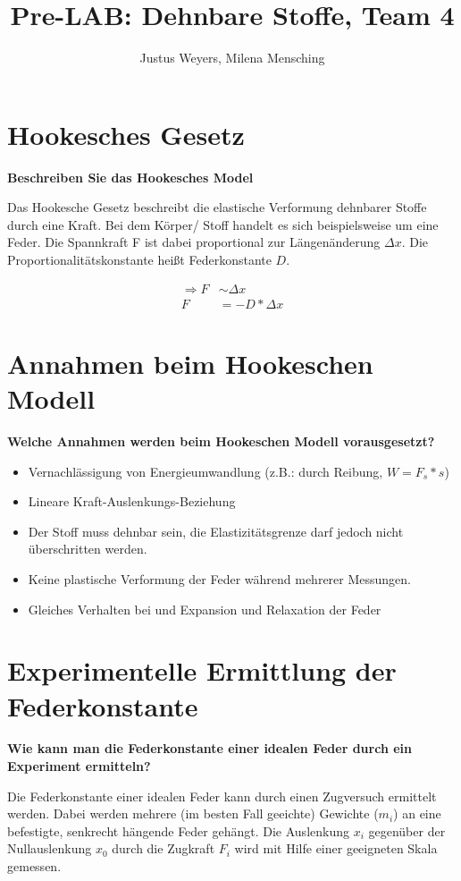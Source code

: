 \documentclass[a4paper, 12pt]{article}
\title{Pre-LAB: Dehnbare Stoffe, Team 4}
\author{Justus Weyers, Milena Mensching}
\begin{document}
\maketitle
\section{Hookesches Gesetz}
\textbf{Beschreiben Sie das Hookesches Model}

Das Hookesche Gesetz beschreibt die elastische Verformung dehnbarer Stoffe durch eine Kraft.
Bei dem Körper/ Stoff handelt es sich beispielsweise um eine Feder. 
Die Spannkraft F ist dabei proportional zur Längenänderung $\Delta x$. 
Die Proportionalitätskonstante heißt Federkonstante $D$.

\begin{equation}
	\begin{split}
		\Rightarrow F&\sim\Delta x\\
		F&= -D*\Delta x
	\end{split}
\end{equation}

\section{Annahmen beim Hookeschen Modell}
\textbf{Welche Annahmen werden beim Hookeschen Modell vorausgesetzt?}

\begin{itemize}
	\item{Vernachlässigung von Energieumwandlung (z.B.: durch Reibung, $W=F_s*s$)}
	\item{Lineare Kraft-Auslenkungs-Beziehung}
	\item{Der Stoff muss dehnbar sein, die Elastizitätsgrenze darf jedoch nicht überschritten werden.}
	\item{Keine plastische Verformung der Feder während mehrerer Messungen.}
	\item{Gleiches Verhalten bei und Expansion und Relaxation der Feder}
\end{itemize}

\section{Experimentelle Ermittlung der Federkonstante}
\textbf{Wie kann man die Federkonstante einer idealen Feder durch ein Experiment ermitteln?}

Die Federkonstante einer idealen Feder kann durch einen Zugversuch ermittelt werden. 
Dabei werden mehrere (im besten Fall geeichte) Gewichte ($m_{i}$) an eine befestigte, senkrecht hängende Feder gehängt. 
Die Auslenkung $x_i$ gegenüber der Nullauslenkung $x_0$ durch die Zugkraft $F_i$ wird mit Hilfe einer geeigneten Skala gemessen.
\end{document}
